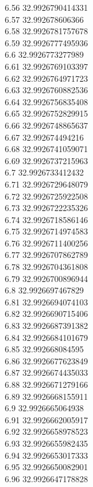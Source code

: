 {6.56	32.9926790414331\\
6.57	32.992678606366\\
6.58	32.9926781757678\\
6.59	32.9926777495936\\
6.6	32.9926773277989\\
6.61	32.9926769103397\\
6.62	32.9926764971723\\
6.63	32.9926760882536\\
6.64	32.9926756835408\\
6.65	32.9926752829915\\
6.66	32.9926748865637\\
6.67	32.992674494216\\
6.68	32.9926741059071\\
6.69	32.9926737215963\\
6.7	32.9926733412432\\
6.71	32.9926729648079\\
6.72	32.9926725922508\\
6.73	32.9926722235326\\
6.74	32.9926718586146\\
6.75	32.9926714974583\\
6.76	32.9926711400256\\
6.77	32.9926707862789\\
6.78	32.9926704361808\\
6.79	32.9926700896944\\
6.8	32.9926697467829\\
6.81	32.9926694074103\\
6.82	32.9926690715406\\
6.83	32.9926687391382\\
6.84	32.9926684101679\\
6.85	32.992668084595\\
6.86	32.9926677623849\\
6.87	32.9926674435033\\
6.88	32.9926671279166\\
6.89	32.9926668155911\\
6.9	32.9926665064938\\
6.91	32.9926662005917\\
6.92	32.9926658978523\\
6.93	32.9926655982435\\
6.94	32.9926653017333\\
6.95	32.9926650082901\\
6.96	32.9926647178828\\
}
